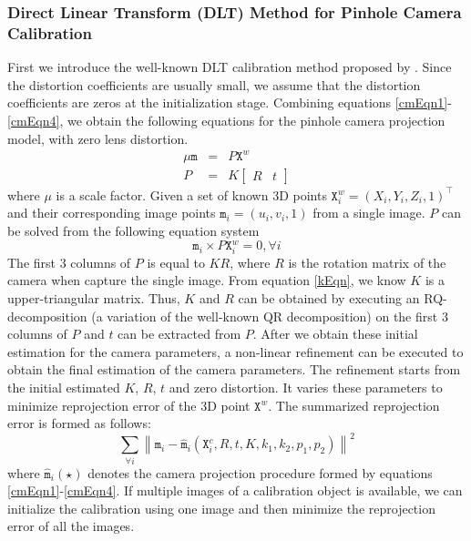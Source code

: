 \documentclass{report}
\begin{document}
\subsubsection{Direct Linear Transform (DLT) Method for Pinhole Camera Calibration}
First we introduce the well-known DLT calibration method proposed by \cite{}. Since the distortion coefficients are usually small, we assume that the distortion coefficients are zeros at the initialization stage. Combining equations \ref{cmEqn1}-\ref{cmEqn4}, we obtain the following equations for the pinhole camera projection model, with zero lens distortion. 
\begin{eqnarray}
\mu \mathtt{m} &=& P \mathtt{X}^w \\
P &=& K 
\begin{bmatrix}
R & t
\end{bmatrix}
\end{eqnarray}
where $\mu$ is a scale factor. Given a set of known 3D points $\mathtt{X}^w_i = (X_i, Y_i, Z_i, 1)^\top$ and their corresponding image points $\mathtt{m}_i = (u_i, v_i, 1)$ from a single image. $P$ can be solved from the following equation system 
\begin{equation}
\mathtt{m}_i \times P \mathtt{X}^w_i= 0, \forall i
\end{equation}
The first 3 columns of $P$ is equal to $K R$, where $R$ is the rotation matrix of the camera when capture the single image. From equation \ref{kEqn}, we know $K$ is a upper-triangular matrix. Thus, $K$ and $R$ can be obtained by executing an RQ-decomposition (a variation of the well-known QR decomposition) on the first 3 columns of $P$ and $t$ can be extracted from $P$. After we obtain these initial estimation for the camera parameters, a non-linear refinement can be executed to obtain the final estimation of the camera parameters. The refinement starts from the initial estimated $K$, $R$, $t$ and zero distortion. It varies these parameters to minimize reprojection error of the 3D point $\mathtt{X}^w$. The summarized reprojection error is formed as follows: 
\begin{equation}
\sum_{\forall i} \left \| \mathtt{m}_i - \hat{\mathtt{m}}_i(\mathtt{X}^c_i, R, t, K, k_1, k_2, p_1, p_2) \right \|^2
\end{equation}
where $\hat{\mathtt{m}}_i(\star)$ denotes the camera projection procedure formed by equations \ref{cmEqn1}-\ref{cmEqn4}. If multiple images of a calibration object is available, we can initialize the calibration using one image and then minimize the reprojection error of all the images. 
\end{document}
